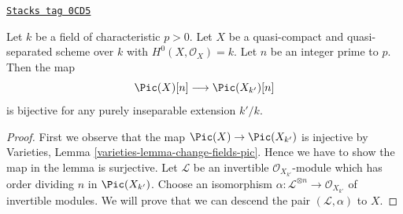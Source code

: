 \begin{lemma}
\label{pic-lemma-torsion-descends}
\href{https://stacks.math.columbia.edu/tag/0CD5}{\texttt{Stacks tag 0CD5}}

Let $k$ be a field of characteristic $p > 0$. Let $X$ be a
quasi-compact and quasi-separated scheme over $k$ with
$H^0(X, \mathcal{O}_X) = k$. Let $n$ be an integer prime to $p$.
Then the map
$$
\Pic(X)[n] \longrightarrow \Pic(X_{k'})[n]
$$
is bijective for any purely inseparable extension $k'/k$.
\end{lemma}

\begin{proof}
First we observe that the map $\Pic(X) \to \Pic(X_{k'})$
is injective by Varieties, Lemma \ref{varieties-lemma-change-fields-pic}.
Hence we have to show the map in the lemma is surjective.
Let $\mathcal{L}$ be an invertible $\mathcal{O}_{X_{k'}}$-module
which has order dividing $n$ in $\Pic(X_{k'})$.
Choose an isomorphism
$\alpha : \mathcal{L}^{\otimes n} \to \mathcal{O}_{X_{k'}}$
of invertible modules.
We will prove that we can descend the pair $(\mathcal{L}, \alpha)$
to $X$.


\end{proof}
